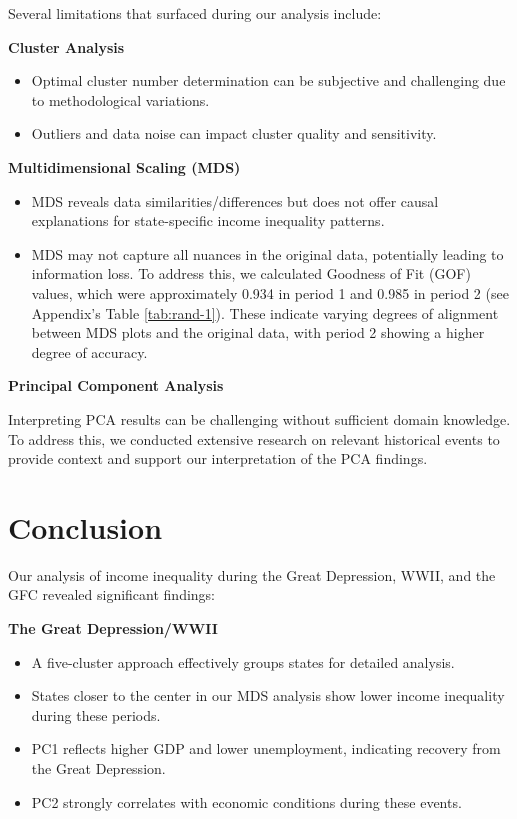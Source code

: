 \documentclass[11pt,a4paper,]{article}
\providecommand{\tightlist}{%
  \setlength{\itemsep}{0pt}\setlength{\parskip}{0pt}}
\begin{document}
Several limitations that surfaced during our analysis include:

\textbf{Cluster Analysis}

\begin{itemize}
\tightlist
\item
  Optimal cluster number determination can be subjective and challenging due to methodological variations.
\item
  Outliers and data noise can impact cluster quality and sensitivity.
\end{itemize}

\textbf{Multidimensional Scaling (MDS)}

\begin{itemize}
\tightlist
\item
  MDS reveals data similarities/differences but does not offer causal explanations for state-specific income inequality patterns.
\item
  MDS may not capture all nuances in the original data, potentially leading to information loss. To address this, we calculated Goodness of Fit (GOF) values, which were approximately 0.934 in period 1 and 0.985 in period 2 (see Appendix's Table \ref{tab:rand-1}). These indicate varying degrees of alignment between MDS plots and the original data, with period 2 showing a higher degree of accuracy.
\end{itemize}

\textbf{Principal Component Analysis}

Interpreting PCA results can be challenging without sufficient domain knowledge. To address this, we conducted extensive research on relevant historical events to provide context and support our interpretation of the PCA findings.

\newpage

\hypertarget{conclusion}{%
\section{Conclusion}\label{conclusion}}

Our analysis of income inequality during the Great Depression, WWII, and the GFC revealed significant findings:

\textbf{The Great Depression/WWII}

\begin{itemize}
\tightlist
\item
  A five-cluster approach effectively groups states for detailed analysis.
\item
  States closer to the center in our MDS analysis show lower income inequality during these periods.
\item
  PC1 reflects higher GDP and lower unemployment, indicating recovery from the Great Depression.
\item
  PC2 strongly correlates with economic conditions during these events.
\end{itemize}
\end{document}

